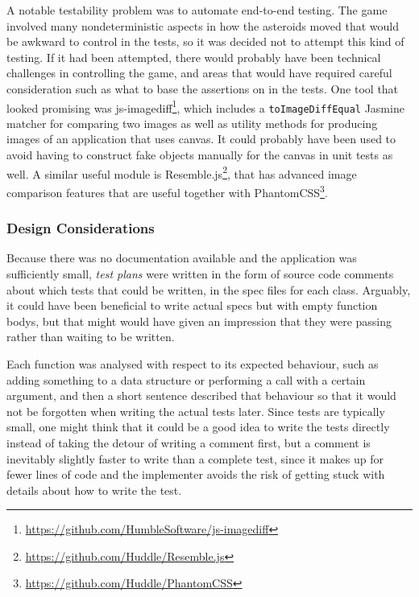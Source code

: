 \documentclass[11pt]{article}
\begin{document}
A notable testability problem was to automate end-to-end testing. The game involved many nondeterministic aspects in how the asteroids moved that would be awkward to control in the tests, so it was decided not to attempt this kind of testing. If it had been attempted, there would probably have been technical challenges in controlling the game, and areas that would have required careful consideration such as what to base the assertions on in the tests. One tool that looked promising was js-imagediff\footnote{\url{https://github.com/HumbleSoftware/js-imagediff}}, which includes a \texttt{toImageDiffEqual} Jasmine matcher for comparing two images as well as utility methods for producing images of an application that uses canvas. It could probably have been used to avoid having to construct fake objects manually for the canvas in unit tests as well. A similar useful module is Resemble.js\footnote{\url{https://github.com/Huddle/Resemble.js}}, that has advanced image comparison features that are useful together with PhantomCSS\footnote{\url{https://github.com/Huddle/PhantomCSS}}.

\subsubsection{Design Considerations}
\label{ssubsection:designconsiderations}

Because there was no documentation available and the application was sufficiently small, \emph{test plans} were written in the form of source code comments about which tests that could be written, in the \gls{spec} files for each class. Arguably, it could have been beneficial to write actual \glspl{spec} but with empty function bodys, but that might would have given an impression that they were passing rather than waiting to be written.

Each function was analysed with respect to its expected behaviour, such as adding something to a data structure or performing a call with a certain argument, and then a short sentence described that behaviour so that it would not be forgotten when writing the actual tests later. Since tests are typically small, one might think that it could be a good idea to write the tests directly instead of taking the detour of writing a comment first, but a comment is inevitably slightly faster to write than a complete test, since it makes up for fewer lines of code and the implementer avoids the risk of getting stuck with details about how to write the test.
\end{document}
